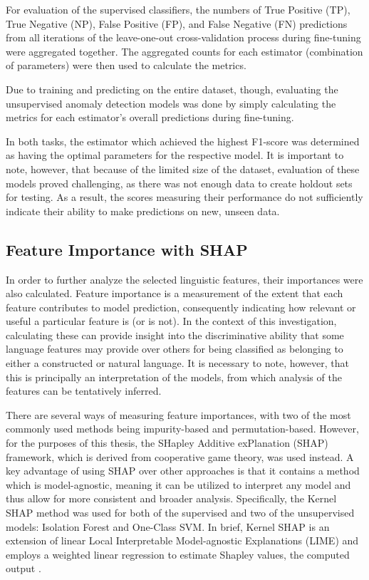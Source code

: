 \documentclass[12pt,a4paper]{article}
\numberwithin{figure}{section}
\numberwithin{table}{section}
\numberwithin{definition}{section}
\begin{document}
For evaluation of the supervised classifiers, the numbers of True Positive (TP), True Negative (NP), False Positive (FP), and False Negative (FN) predictions from all iterations of the leave-one-out cross-validation process during fine-tuning were aggregated together. The aggregated counts for each estimator (combination of parameters) were then used to calculate the metrics. 

Due to training and predicting on the entire dataset, though, evaluating the unsupervised anomaly detection models was done by simply calculating the metrics for each estimator's overall predictions during fine-tuning.

In both tasks, the estimator which achieved the highest F1-score was determined as having the optimal parameters for the respective model. It is important to note, however, that because of the limited size of the dataset, evaluation of these models proved challenging, as there was not enough data to create holdout sets for testing. As a result, the scores measuring their performance do not sufficiently indicate their ability to make predictions on new, unseen data. 

\subsection{Feature Importance with SHAP}
\label{ssec:featureimportances}

In order to further analyze the selected linguistic features, their importances were also calculated. Feature importance is a measurement of the extent that each feature contributes to model prediction, consequently indicating how relevant or useful a particular feature is (or is not). In the context of this investigation, calculating these can provide insight into the discriminative ability that some language features may provide over others for being classified as belonging to either a constructed or natural language. It is necessary to note, however, that this is principally an interpretation of the models, from which analysis of the features can be tentatively inferred.


There are several ways of measuring feature importances, with two of the most commonly used methods being impurity-based and permutation-based. However, for the purposes of this thesis, the SHapley Additive exPlanation (SHAP) framework, which is derived from cooperative game theory, was used instead. A key advantage of using SHAP over other approaches is that it contains a method which is model-agnostic, meaning it can be utilized to interpret any model and thus allow for more consistent and broader analysis. Specifically, the Kernel SHAP method was used for both of the supervised and two of the unsupervised models: Isolation Forest and One-Class SVM. In brief, Kernel SHAP is an extension of linear Local Interpretable Model-agnostic Explanations (LIME) and employs a weighted linear regression to estimate Shapley values, the computed output \parencite{Lundberg2017article}.
\end{document}
